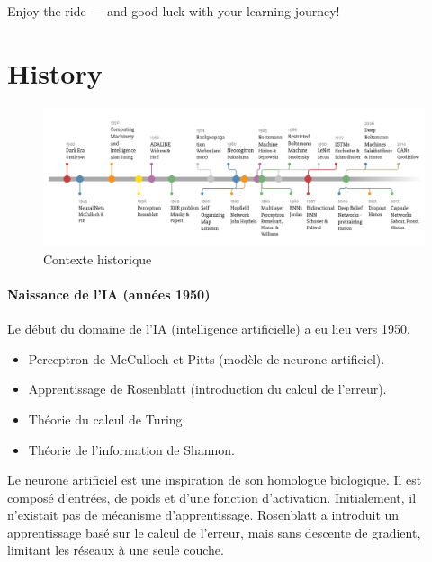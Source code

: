 \documentclass{article}
\begin{document}
Enjoy the ride — and good luck with your learning journey!

\newpage

\tableofcontents
\newpage

\section{History} \label{sec:history}

\begin{figure}[ht]
    \centering
    \includegraphics[width=1\linewidth]{graphics/ai_history.png}
    \caption{Contexte historique}
    \label{fig:ai-history}
\end{figure}

\paragraph{Naissance de l'IA (années 1950)}
Le début du domaine de l'IA (intelligence artificielle) a eu lieu vers 1950.
\begin{itemize}
    \item Perceptron de McCulloch et Pitts (modèle de neurone artificiel).
    \item Apprentissage de Rosenblatt (introduction du calcul de l'erreur).
    \item Théorie du calcul de Turing.
    \item Théorie de l'information de Shannon.
\end{itemize}

Le neurone artificiel est une inspiration de son homologue biologique. Il est composé d'entrées, de poids et d'une fonction d'activation. Initialement, il n'existait pas de mécanisme d'apprentissage. Rosenblatt a introduit un apprentissage basé sur le calcul de l'erreur, mais sans descente de gradient, limitant les réseaux à une seule couche.
\end{document}
